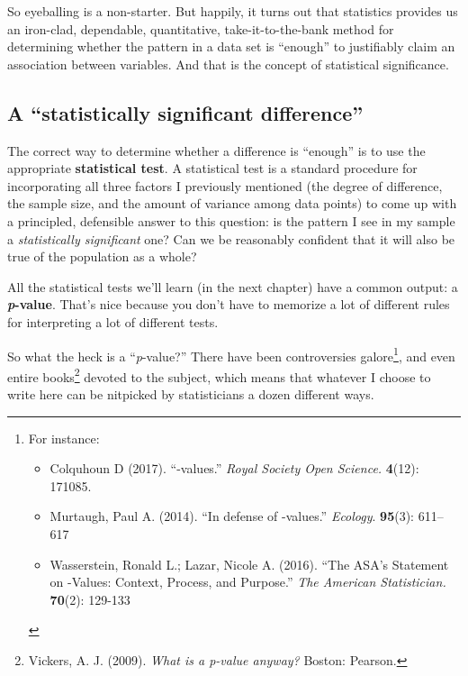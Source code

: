So eyeballing is a non-starter. But happily, it turns out that statistics
provides us an iron-clad, dependable, quantitative, take-it-to-the-bank method
for determining whether the pattern in a data set is ``enough'' to justifiably
claim an association between variables. And that is the concept of statistical
significance.

\subsection{A ``statistically significant difference''}

The correct way to determine whether a difference is ``enough'' is to use the
appropriate \textbf{statistical test}. A statistical test is a standard
procedure for incorporating all three factors I previously mentioned (the
degree of difference, the sample size, and the amount of variance among data
points) to come up with a principled, defensible answer to this question: is
the pattern I see in my sample a \textit{statistically significant} one? Can we
be reasonably confident that it will also be true of the population as a whole?


All the statistical tests we'll learn (in the next chapter) have a common
output: a \textbf{\textit{p}-value}. That's nice because you don't have to
memorize a lot of different rules for interpreting a lot of different tests.

So what the heck is a ``\textit{p}-value?'' There have been controversies
galore\footnote{For instance:\\
\vspace{-.15in}
\begin{itemize}[nosep]
\item Colquhoun D (2017). ``-values.'' \textit{Royal Society Open Science.}
\textbf{4}(12): 171085.
\item Murtaugh, Paul A. (2014). ``In defense of -values.'' \textit{Ecology}.
\textbf{95}(3): 611--617
\item Wasserstein, Ronald L.; Lazar, Nicole A. (2016). ``The ASA's Statement on
-Values: Context, Process, and Purpose.'' \textit{The American Statistician.}
\textbf{70}(2): 129-133
\end{itemize}
}, and even entire
books\footnote{Vickers, A. J. (2009). \textit{What is a p-value anyway?}
Boston: Pearson.} devoted to the subject, which means that whatever I choose to
write here can be nitpicked by statisticians a dozen different ways.

